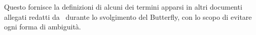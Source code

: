Questo  fornisce la definizioni di alcuni dei termini apparsi in altri documenti allegati redatti 
da \gruppo\ durante lo svolgimento del  Butterfly, con
lo scopo di evitare ogni forma di ambiguit\`a.